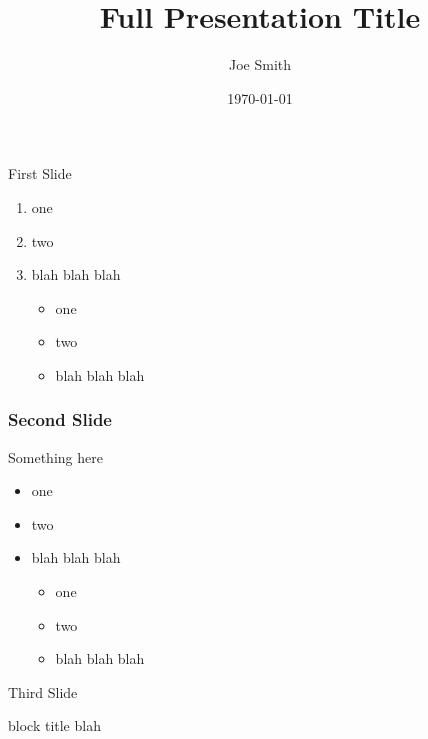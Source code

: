 \documentclass{beamer}
\title[Short Talk Title]{Full Presentation Title}
\author[J. Smith]{Joe Smith}
\date[2015]{\today}
\begin{document}
\begin{frame}
\titlepage
\end{frame}


\begin{frame}{First Slide}

\begin{enumerate}
\item one
\item two
\item blah blah blah

\begin{itemize}
\item one
\item two
\item blah blah blah

\end{itemize}

\end{enumerate}

\end{frame}


\begin{frame}
\frametitle{Second Slide}

Something here

\begin{itemize}
\item one
\item two
\item blah blah blah

\begin{itemize}
\item one
\item two
\item blah blah blah

\end{itemize}

\end{itemize}

\end{frame}


\begin{frame}{Third Slide}
\begin{block}{block title}
blah
\end{block}
\end{frame}
\end{document}

